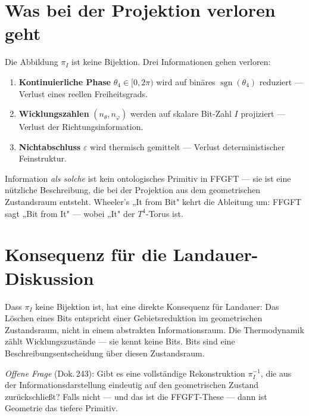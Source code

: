 \section{Was bei der Projektion verloren geht}

Die Abbildung $\pi_I$ ist keine Bijektion. Drei Informationen gehen verloren:

\begin{enumerate}
  \item \textbf{Kontinuierliche Phase} $\theta_4 \in [0, 2\pi)$ wird auf binäres
    $\operatorname{sgn}(\theta_4)$ reduziert --- Verlust eines reellen Freiheitsgrads.
  \item \textbf{Wicklungszahlen} $(n_\theta, n_\varphi)$ werden auf skalare Bit-Zahl
    $I$ projiziert --- Verlust der Richtungsinformation.
  \item \textbf{Nichtabschluss} $\varepsilon$ wird thermisch gemittelt ---
    Verlust deterministischer Feinstruktur.
\end{enumerate}

\begin{keyresult}
Information \emph{als solche} ist kein ontologisches Primitiv in FFGFT ---
sie ist eine nützliche Beschreibung, die bei der Projektion aus dem
geometrischen Zustandsraum entsteht. Wheeler's „It from Bit" kehrt die
Ableitung um: FFGFT sagt „Bit from It" --- wobei „It" der $T^4$-Torus ist.
\end{keyresult}

\section{Konsequenz für die Landauer-Diskussion}

Dass $\pi_I$ keine Bijektion ist, hat eine direkte Konsequenz für
Landauer: Das Löschen eines Bits entspricht einer Gebietsreduktion im
geometrischen Zustandsraum, nicht in einem abstrakten Informationsraum.
Die Thermodynamik zählt Wicklungszustände --- sie kennt keine Bits.
Bits sind eine Beschreibungsentscheidung über diesen Zustandsraum.

\textit{Offene Frage} (Dok.\,243): Gibt es eine vollständige Rekonstruktion
$\pi_I^{-1}$, die aus der Informationsdarstellung eindeutig auf den
geometrischen Zustand zurückschließt? Falls nicht --- und das ist die
FFGFT-These --- dann ist Geometrie das tiefere Primitiv.
